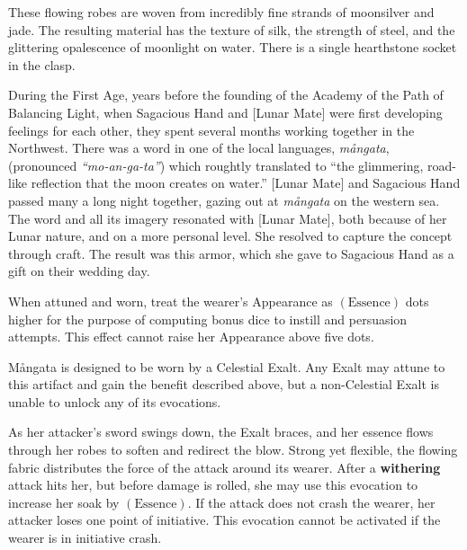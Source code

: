 ﻿


These flowing robes are woven from incredibly fine strands of moonsilver and
jade. The resulting material has the texture of silk, the strength of steel,
and the glittering opalescence of moonlight on water. There is a single
hearthstone socket in the clasp.

During the First Age, years before the founding of the Academy of the Path of
Balancing Light, when Sagacious Hand and [Lunar Mate] were first developing
feelings for each other, they spent several months working together in the
Northwest. There was a word in one of the local languages, \textit{mångata},
(pronounced \textit{``mo-an-ga-ta''}) which roughtly translated to ``the
glimmering, road-like reflection that the moon creates on water.'' [Lunar Mate]
and Sagacious Hand passed many a long night together, gazing out at
\textit{mångata} on the western sea. The word and all its imagery resonated
with [Lunar Mate], both because of her Lunar nature, and on a more personal
level. She resolved to capture the concept through craft. The result was this
armor, which she gave to Sagacious Hand as a gift on their wedding day.


When attuned and worn, treat the wearer's Appearance as $(\mathrm{Essence})$
dots higher for the purpose of computing bonus dice to instill and persuasion
attempts. This effect cannot raise her Appearance above five dots.

Mångata is designed to be worn by a Celestial Exalt. Any Exalt may attune to
this artifact and gain the benefit described above, but a non-Celestial Exalt
is unable to unlock any of its evocations.


As her attacker's sword swings down, the Exalt braces, and her essence flows
through her robes to soften and redirect the blow. Strong yet flexible, the
flowing fabric distributes the force of the attack around its wearer. After a
\textbf{withering} attack hits her, but before damage is rolled, she may use
this evocation to increase her soak by $(\mathrm{Essence})$. If the attack does
not crash the wearer, her attacker loses one point of initiative. This
evocation cannot be activated if the wearer is in initiative crash.


